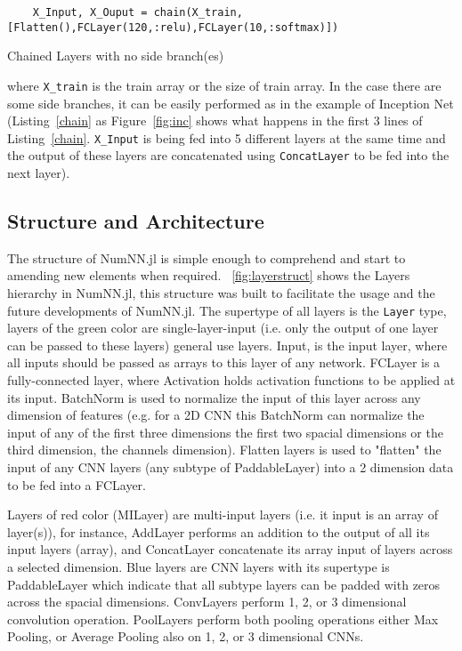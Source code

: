 \begin{listing}[H]
	\begin{verbatim}
	X_Input, X_Ouput = chain(X_train,[Flatten(),FCLayer(120,:relu),FCLayer(10,:softmax)])
	\end{verbatim}
	\caption{Chained Layers with no side branch(es)}\label{chain}
\end{listing}


where \texttt{X_train} is the train array or the size of train array. In the case there are some side branches, it can be easily performed as in the example of Inception Net \cite{Szegedy2016} (Listing~\ref{chain} as Figure~\ref{fig:inc} shows what happens in the first 3 lines of Listing~\ref{chain}. \texttt{X_Input} is being fed into 5 different layers at the same time and the output of these layers are concatenated using \texttt{ConcatLayer} to be fed into the next layer). 


\subsection{Structure and Architecture}\label{subsec:saa}

The structure of NumNN.jl is simple enough to comprehend and start to amending new elements when required. \figurename~\ref{fig:layerstruct} shows the Layers hierarchy in NumNN.jl, this structure was built to facilitate the usage and the future developments of NumNN.jl. The supertype of all layers is the \texttt{Layer} type, layers of the green color are single-layer-input (i.e. only the output of one layer can be passed to these layers) general use layers. Input, is the input layer, where all inputs should be passed as arrays to this layer of any network. FCLayer is a fully-connected layer, where Activation holds activation functions to be applied at its input. BatchNorm is used to normalize the input of this layer across any dimension of features (e.g. for a 2D CNN this BatchNorm can normalize the input of any of the first three dimensions the first two spacial dimensions or the third dimension, the channels dimension). Flatten layers is used to "flatten" the input of any CNN layers (any subtype of PaddableLayer) into a 2 dimension data to be fed into a FCLayer.

Layers of red color (MILayer) are multi-input layers (i.e. it input is an array of layer(s)), for instance, AddLayer performs an addition to the output of all its input layers (array), and ConcatLayer concatenate its array input of layers across a selected dimension. Blue layers are CNN layers with its supertype is PaddableLayer which indicate that all subtype layers can be padded with zeros across the spacial dimensions. ConvLayers perform 1, 2, or 3 dimensional convolution operation. PoolLayers perform both pooling operations either Max Pooling, or Average Pooling also on 1, 2, or 3 dimensional CNNs.

